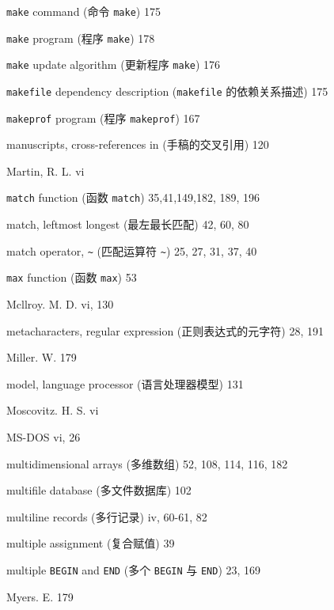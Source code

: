\begin{multicols}{3}
\hangindent=3pc  \verb'make' command (命令 \verb'make') 175

\hangindent=3pc  \verb'make' program (程序 \verb'make') 178

\hangindent=3pc  \verb'make' update algorithm (更新程序
\verb'make') 176

\hangindent=3pc  \verb'makefile' dependency description
(\verb'makefile' 的依赖关系描述) 175

\hangindent=3pc  \verb'makeprof' program (程序 \verb'makeprof') 167

\hangindent=3pc  manuscripts, cross-references in
(手稿的交叉引用) 120

\hangindent=3pc  Martin, R. L. vi

\hangindent=3pc  \verb'match' function (函数 \verb'match')
35,41,149,182, 189, 196

\hangindent=3pc  match, leftmost longest (最左最长匹配) 42, 60, 80

\hangindent=3pc  match operator, \verb'~' (匹配运算符 \verb'~')
25, 27, 31, 37, 40

\hangindent=3pc  \verb'max' function (函数 \verb'max') 53

\hangindent=3pc  Mcllroy. M. D. vi, 130

\hangindent=3pc  metacharacters, regular expression
(正则表达式的元字符) 28, 191

\hangindent=3pc  Miller. W. 179

\hangindent=3pc  model, language processor (语言处理器模型) 131

\hangindent=3pc  Moscovitz. H. S. vi

\hangindent=3pc  MS-DOS vi, 26

\hangindent=3pc  multidimensional arrays (多维数组)
52, 108, 114, 116, 182

\hangindent=3pc  multifile database (多文件数据库) 102

\hangindent=3pc  multiline records (多行记录) iv, 60-61, 82

\hangindent=3pc  multiple assignment (复合赋值) 39

\hangindent=3pc  multiple \verb'BEGIN' and \verb'END' (多个
\verb'BEGIN' 与 \verb'END') 23, 169

\hangindent=3pc  Myers. E. 179


\end{multicols}
